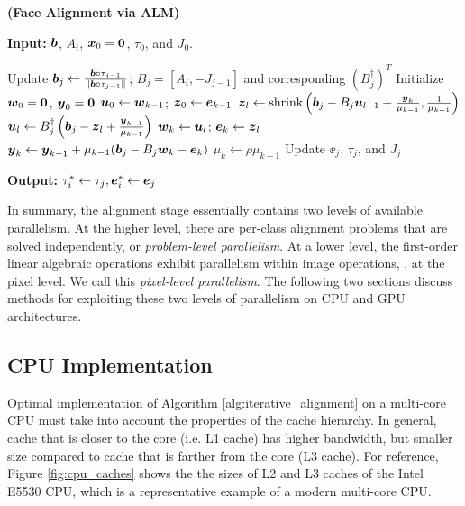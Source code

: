 \begin{algorithm}[ht!]
\caption{\bf (Face Alignment via ALM)} \label{alg:iterative_alignment}
\small
{\bf Input:} $\boldsymbol{b}$, $A_i$, ${\boldsymbol{x}}_0 = \boldsymbol{0}$, $\tau_0$, and $J_0$.
\begin{algorithmic}[1]
\STATE Update $\boldsymbol{b}_j \leftarrow \frac{\boldsymbol{b}\circ \tau_{j-1}}{\|\boldsymbol{b}\circ \tau_{j-1}\|}$; $B_j= [A_i, -J_{j-1}]$ and corresponding $(B_j^\dagger)^T$
\STATE Initialize ${\boldsymbol{w}}_0 = \boldsymbol 0$, ${\boldsymbol{y}}_0 = \boldsymbol 0$
\STATE ${\boldsymbol{u}}_0\leftarrow {\boldsymbol{w}}_{k-1}$; ${\boldsymbol{z}}_0\leftarrow {\boldsymbol{e}}_{k-1}$
\STATE ${\boldsymbol{z}}_l \leftarrow {\text{shrink}}\left(\boldsymbol{b}_j - B_j{\boldsymbol{u}}_{l-1} + \frac{{\boldsymbol{y}}_{k}}{\mu_{k-1}}, \frac{1}{\mu_{k-1}}\right)$
\STATE ${\boldsymbol{u}}_l \leftarrow B_j^\dagger \left(\boldsymbol{b}_j - {\boldsymbol{z}}_{l} + \frac{{\boldsymbol{y}}_{k-1}}{\mu_{k-1}} \right) $
\ENDWHILE
\STATE ${\boldsymbol{w}}_k \leftarrow {\boldsymbol{u}}_l$; ${\boldsymbol{e}}_k \leftarrow {\boldsymbol{z}}_l$
\STATE ${\boldsymbol{y}}_{k} \leftarrow {\boldsymbol{y}}_{k-1} + \mu_{k-1} (\boldsymbol{b}_j - B_j{\boldsymbol{w}}_{k} - \boldsymbol{e}_{k})$
\STATE $\mu_{k} \leftarrow \rho\mu_{k-1}$
\ENDWHILE
\STATE Update $\ee_j$, $\tau_j$, and $J_j$
\ENDWHILE
\end{algorithmic}
{\bf Output:} $\tau_i^*\leftarrow \tau_j, \boldsymbol{e}_i^*\leftarrow {\boldsymbol{e}}_j$
\end{algorithm}

In summary, the alignment stage essentially contains two levels of available
parallelism. At the higher level, there are per-class alignment problems
that are solved independently, or \emph{problem-level parallelism}.  At a lower
level, the first-order linear algebraic operations exhibit parallelism within
image operations, \ie, at the pixel level.  We call this \emph{pixel-level
parallelism}.  The following two sections discuss methods for exploiting
these two levels of parallelism on CPU and GPU architectures.

\subsection{CPU Implementation} 
\label{sec:alignment_implementation_cpu}

Optimal implementation of Algorithm \ref{alg:iterative_alignment} on a multi-core CPU must take 
into account the properties of the cache hierarchy. In general, cache that is 
closer to the core (i.e. L1 cache) has higher bandwidth, but smaller size compared to cache
that is farther from the core (L3 cache).  For reference, Figure \ref{fig:cpu_caches} 
shows the the sizes of L2 and L3 caches of the Intel E5530 CPU, 
which is a representative example of a modern multi-core CPU. 

